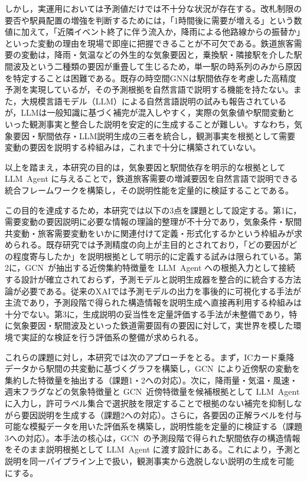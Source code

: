 \documentclass[technicalreport]{ieicej}
\newcommand{\LLM}{LLM}
\newcommand{\GCN}{GCN}
\begin{document}
しかし，実運用においては予測値だけでは不十分な状況が存在する。改札制限の要否や駅員配置の増強を判断するためには，「1時間後に需要が増える」という数値に加えて，「近隣イベント終了に伴う流入か，降雨による他路線からの振替か」といった変動の理由を現場で即座に把握できることが不可欠である。鉄道旅客需要の変動は，降雨・気温などの外生的な気象要因と，乗換駅・隣接駅を介した駅間波及という二種類の要因が重畳して生じるため，単一駅の時系列のみから原因を特定することは困難である。既存の時空間GNNは駅間依存を考慮した高精度予測を実現しているが\cite{li2017diffusion,10.5555/3304222.3304273,wu2019graph,bai2020adaptive}，その予測根拠を自然言語で説明する機能を持たない。また，大規模言語モデル（LLM）による自然言語説明の試みも報告されているが\cite{guo2024towards}，LLMは一般知識に基づく補完が混入しやすく，実際の気象値や駅間変動といった観測事実と整合した説明を安定的に生成することが難しい。すなわち，気象要因・駅間依存・LLM説明生成の三者を統合し，観測事実を根拠として需要変動の要因を説明する枠組みは，これまで十分に構築されていない。

以上を踏まえ，本研究の目的は，気象要因と駅間依存を明示的な根拠として \LLM\ Agent に与えることで，鉄道旅客需要の増減要因を自然言語で説明できる統合フレームワークを構築し，その説明性能を定量的に検証することである。

この目的を達成するため，本研究では以下の3点を課題として設定する。第1に，需要変動の要因説明に必要な情報の理論的整理が不十分であり，気象条件・駅間共変動・旅客需要変動をいかに関連付けて定義・形式化するかという枠組みが求められる。既存研究では予測精度の向上が主目的とされており，「どの要因がどの程度寄与したか」を説明根拠として明示的に定義する試みは限られている。第2に，\GCN\ が抽出する近傍集約特徴量を \LLM\ Agent への根拠入力として接続する設計が確立されておらず，予測モデルと説明生成器を整合的に統合する方法論が必要である。従来のXAIでは予測モデルの出力を事後的に可視化する手法が主流であり，予測段階で得られた構造情報を説明生成へ直接再利用する枠組みは十分でない。第3に，生成説明の妥当性を定量評価する手法が未整備であり，特に気象要因・駅間波及といった鉄道需要固有の要因に対して，実世界を模した環境で実証的な検証を行う評価系の整備が求められる。

これらの課題に対し，本研究では次のアプローチをとる。まず，ICカード乗降データから駅間の共変動に基づくグラフを構築し，\GCN\ により近傍駅の変動を集約した特徴量を抽出する（課題1・2への対応）。次に，降雨量・気温・風速・週末フラグなどの気象特徴量と \GCN\ 近傍特徴量を候補根拠として \LLM\ Agent に入力し，許可ラベル集合で選択肢を限定することで根拠のない補完を抑制しながら要因説明を生成する（課題2への対応）。さらに，各要因の正解ラベルを付与可能な模擬データを用いた評価系を構築し，説明性能を定量的に検証する（課題3への対応）。本手法の核心は，\GCN\ の予測段階で得られた駅間依存の構造情報をそのまま説明根拠として \LLM\ Agent に渡す設計にある。これにより，予測と説明を同一パイプライン上で扱い，観測事実から逸脱しない説明の生成を可能にする。
\end{document}
